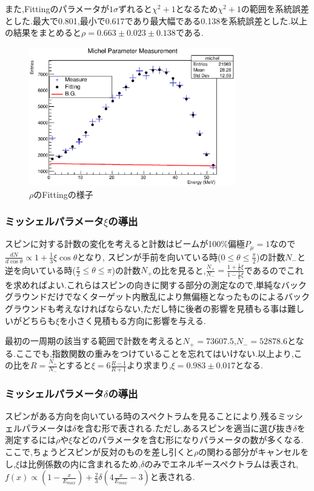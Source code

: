 また,Fittingのパラメータが$1\sigma$ずれると$\chi^2+1$となるため$\chi^2+1$の範囲を系統誤差とした.最大で0.801,最小で0.617であり最大幅である0.138を系統誤差とした.以上の結果をまとめると$\rho=0.663\pm0.023\pm0.138$である.

\begin{figure}[bht]
  \centering
  \includegraphics[width=0.8\textwidth]{figure/hatano/rho.eps}
  \caption{$\rho$のFittingの様子}
  \label{hatano_fig:rho}
\end{figure}

\subsubsection{ミッシェルパラメータ$\xi$の導出}
スピンに対する計数の変化を考えると計数はビームが100\%偏極$P_{\mu}=1$なので$\frac{dN}{d\cos\theta}\propto 1+\frac{1}{3}\xi\cos\theta$となり,
スピンが手前を向いている時($0\leq\theta\leq\frac{\pi}{2}$)の計数$N_-$と逆を向いている時($\frac{\pi}{2}\leq\theta\leq\pi$)の計数$N_+$の比を見ると,$\frac{N_+}{N_-}=\frac{1+\frac{1}{6}\xi}{1-\frac{1}{6}\xi}$であるのでこれを求めればよい.これらはスピンの向きに関する部分の測定なので,単純なバックグラウンドだけでなくターゲット内散乱により無偏極となったものによるバックグラウンドも考えなければならない,ただし特に後者の影響を見積もる事は難しいがどちらも$\xi$を小さく見積もる方向に影響を与える.

最初の一周期の該当する範囲で計数を考えると$N_+=73607.5$,$N_-=52878.6$となる.ここでも,指数関数の重みをつけていることを忘れてはいけない.以上より,この比を$R=\frac{N_+}{N_-}$とすると$\xi=6\frac{R-1}{R+1}$より求まり,$\xi=0.983\pm0.017$となる.


\subsubsection{ミッシェルパラメータ$\delta$の導出}
スピンがある方向を向いている時のスペクトラムを見ることにより,残るミッシェルパラメータは$\delta$を含む形で表される.ただし,あるスピンを適当に選び抜き$\delta$を測定するには$\rho$や$\xi$などのパラメータを含む形になりパラメータの数が多くなる.ここで,ちょうどスピンが反対のものを差し引くと$\rho$の関わる部分がキャンセルをし,$\xi$は比例係数の内に含まれるため,$\delta$のみでエネルギースペクトラムは表され,$f(x)\propto(1-\frac{x}{E_{max}})+\frac{2}{3}\delta(4\frac{x}{E_{max}}-3)$と表される.

